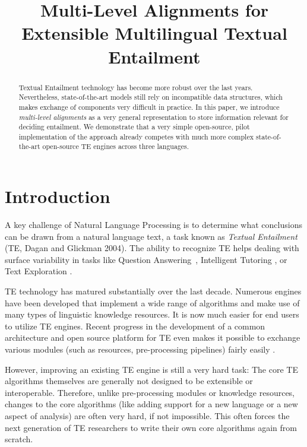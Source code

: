 \documentclass[11pt,letterpaper]{article}
\title{Multi-Level Alignments for Extensible Multilingual Textual
  Entailment}
\date{}
\begin{document}
\maketitle
\begin{abstract}
  Textual Entailment technology has become more robust over the last
  years. Nevertheless, state-of-the-art models still rely on
  incompatible data structures, which makes exchange of components
  very difficult in practice. In this paper, we introduce   {\em
  multi-level alignments} as a very general representation to store
  information relevant for deciding entailment.
  We demonstrate that a very simple open-source, pilot implementation
  of the approach already competes with much more complex
  state-of-the-art open-source TE engines across three languages. 
\end{abstract}

\section{Introduction}
A key challenge of Natural Language Processing is to determine what
conclusions can be drawn from a natural language text, a task known as
\textit{Textual Entailment} (TE, Dagan and Glickman
2004).\nocite{dagan04:_probab_textual_entail} The ability to recognize
TE helps dealing with surface variability in tasks like Question
Answering~\cite{harabagiu-hickl:2006:COLACL}, Intelligent Tutoring
\cite{nielsen09:_recog_entail_in_intel_tutor_system}, or Text
Exploration \cite{berant2012learning}.

TE technology has matured substantially over the last decade. Numerous
engines have been developed that implement a wide range of algorithms
and make use of many types of linguistic knowledge resources. It is
now much easier for end users to utilize TE engines. Recent progress
in the development of a common architecture and open source platform
for TE even makes it possible to exchange various modules (such as
resources, pre-processing pipelines) fairly easily \cite{EOP-arch}.

However, improving an existing TE engine is still a very hard task:
The core TE algorithms themselves are generally not designed to be
extensible or interoperable. Therefore, unlike pre-processing modules 
or knowledge resources, changes to the core algorithms (like adding
support for a new language or a new aspect of analysis) are often very
hard, if not impossible. This often forces the next generation of TE
researchers to write their own core algorithms again from scratch. 
\end{document}
